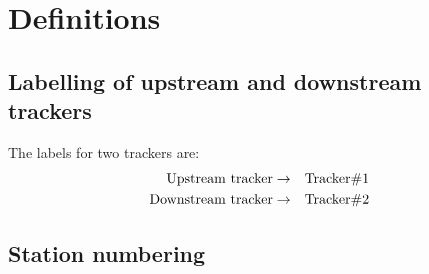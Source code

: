 \section{Definitions}
\label{Sect:Definitions}

\subsection{Labelling of upstream and downstream trackers}
\label{SubSect:TkrLabel}

The labels for two trackers are: 
\begin{eqnarray}
  {\rm Upstream~tracker}   & \rightarrow & {\rm Tracker \# 1} \nonumber \\
  {\rm Downstream~tracker} & \rightarrow & {\rm Tracker \# 2} \nonumber 
\end{eqnarray}

\subsection{Station numbering}
\label{SubSect:StnNumbering}

